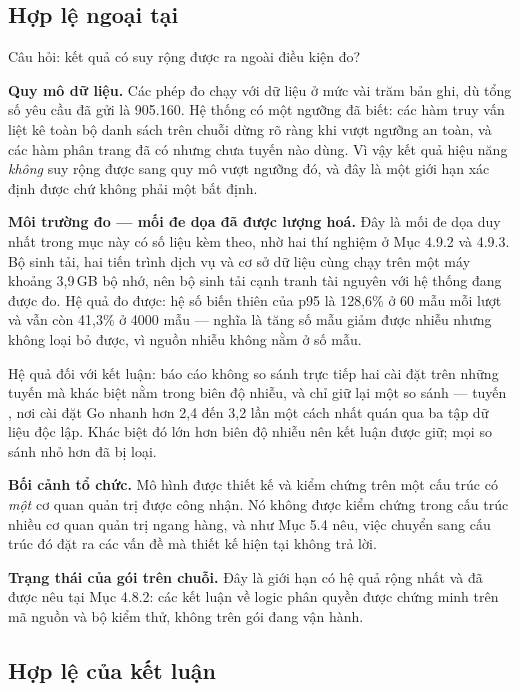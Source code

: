\subsection{Hợp lệ ngoại tại}

Câu hỏi: kết quả có suy rộng được ra ngoài điều kiện đo?

\noindent \textbf{Quy mô dữ liệu.} Các phép đo chạy với dữ liệu ở mức vài trăm bản ghi, dù tổng số yêu cầu đã gửi là 905.160. Hệ thống có một ngưỡng đã biết: các hàm truy vấn liệt kê toàn bộ danh sách trên chuỗi dừng rõ ràng khi vượt ngưỡng an toàn, và các hàm phân trang đã có nhưng chưa tuyến nào dùng. Vì vậy kết quả hiệu năng \emph{không} suy rộng được sang quy mô vượt ngưỡng đó, và đây là một giới hạn xác định được chứ không phải một bất định.

\noindent \textbf{Môi trường đo --- mối đe dọa đã được lượng hoá.} Đây là mối đe dọa duy nhất trong mục này có số liệu kèm theo, nhờ hai thí nghiệm ở Mục 4.9.2 và 4.9.3. Bộ sinh tải, hai tiến trình dịch vụ và cơ sở dữ liệu cùng chạy trên một máy khoảng 3,9\,GB bộ nhớ, nên bộ sinh tải cạnh tranh tài nguyên với hệ thống đang được đo. Hệ quả đo được: hệ số biến thiên của p95 là 128,6\% ở 60 mẫu mỗi lượt và vẫn còn 41,3\% ở 4000 mẫu --- nghĩa là tăng số mẫu giảm được nhiễu nhưng không loại bỏ được, vì nguồn nhiễu không nằm ở số mẫu.

Hệ quả đối với kết luận: báo cáo không so sánh trực tiếp hai cài đặt trên những tuyến mà khác biệt nằm trong biên độ nhiễu, và chỉ giữ lại một so sánh --- tuyến , nơi cài đặt Go nhanh hơn 2,4 đến 3,2 lần một cách nhất quán qua ba tập dữ liệu độc lập. Khác biệt đó lớn hơn biên độ nhiễu nên kết luận được giữ; mọi so sánh nhỏ hơn đã bị loại.

\noindent \textbf{Bối cảnh tổ chức.} Mô hình được thiết kế và kiểm chứng trên một cấu trúc có \emph{một} cơ quan quản trị được công nhận. Nó không được kiểm chứng trong cấu trúc nhiều cơ quan quản trị ngang hàng, và như Mục 5.4 nêu, việc chuyển sang cấu trúc đó đặt ra các vấn đề mà thiết kế hiện tại không trả lời.

\noindent \textbf{Trạng thái của gói trên chuỗi.} Đây là giới hạn có hệ quả rộng nhất và đã được nêu tại Mục 4.8.2: các kết luận về logic phân quyền được chứng minh trên mã nguồn và bộ kiểm thử, không trên gói đang vận hành.

\subsection{Hợp lệ của kết luận}

